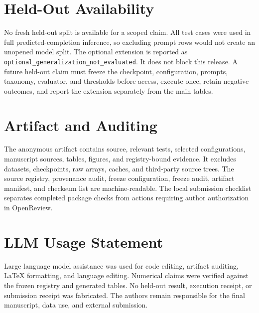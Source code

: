 \documentclass[10pt,twocolumn,letterpaper]{article}
\begin{document}
\section{Held-Out Availability}
No fresh held-out split is available for a scoped claim. All test cases were used
in full predicted-completion inference, so excluding prompt rows would not create
an unopened model split. The optional extension is reported as
\texttt{optional\_generalization\_not\_evaluated}. It does not block this release.
A future held-out claim must freeze the checkpoint, configuration, prompts,
taxonomy, evaluator, and thresholds before access, execute once, retain negative
outcomes, and report the extension separately from the main tables.

\section{Artifact and Auditing}
The anonymous artifact contains source, relevant tests, selected configurations,
manuscript sources, tables, figures, and registry-bound evidence. It excludes
datasets, checkpoints, raw arrays, caches, and third-party source trees. The
source registry, provenance audit, freeze configuration, freeze audit, artifact
manifest, and checksum list are machine-readable. The local submission checklist
separates completed package checks from actions requiring author authorization in
OpenReview.

\section*{LLM Usage Statement}
Large language model assistance was used for code editing, artifact auditing,
LaTeX formatting, and language editing. Numerical claims were verified against
the frozen registry and generated tables. No held-out result, execution receipt,
or submission receipt was fabricated. The authors remain responsible for the
final manuscript, data use, and external submission.
\end{document}
